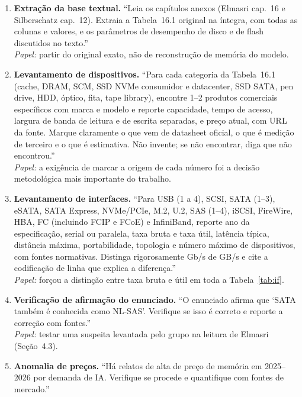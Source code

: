 \documentclass[11pt,a4paper]{article}
\begin{document}
\begin{enumerate}[label=\textbf{P\arabic*.},leftmargin=*]
\item \textbf{Extração da base textual.} ``Leia os capítulos anexos (Elmasri cap.~16 e
      Silberschatz cap.~12). Extraia a Tabela~16.1 original na íntegra, com todas as colunas e
      valores, e os parâmetros de desempenho de disco e de flash discutidos no texto.''\\
      \emph{Papel:} partir do original exato, não de reconstrução de memória do modelo.
\item \textbf{Levantamento de dispositivos.} ``Para cada categoria da Tabela~16.1 (cache, DRAM,
      SCM, SSD NVMe consumidor e datacenter, SSD SATA, pen drive, HDD, óptico, fita, tape
      library), encontre 1--2 produtos comerciais específicos com marca e modelo e reporte
      capacidade, tempo de acesso, largura de banda de leitura e de escrita separadas, e preço
      atual, com URL da fonte. Marque claramente o que vem de datasheet oficial, o que é
      medição de terceiro e o que é estimativa. Não invente; se não encontrar, diga que não
      encontrou.''\\
      \emph{Papel:} a exigência de marcar a origem de cada número foi a decisão metodológica
      mais importante do trabalho.
\item \textbf{Levantamento de interfaces.} ``Para USB (1 a 4), SCSI, SATA (1--3), eSATA, SATA
      Express, NVMe/PCIe, M.2, U.2, SAS (1--4), iSCSI, FireWire, HBA, FC (incluindo FCIP e
      FCoE) e InfiniBand, reporte ano da especificação, serial ou paralela, taxa bruta e taxa
      útil, latência típica, distância máxima, portabilidade, topologia e número máximo de
      dispositivos, com fontes normativas. Distinga rigorosamente Gb/s de GB/s e cite a
      codificação de linha que explica a diferença.''\\
      \emph{Papel:} forçou a distinção entre taxa bruta e útil em toda a Tabela~\ref{tab:if}.
\item \textbf{Verificação de afirmação do enunciado.} ``O enunciado afirma que `SATA também é
      conhecida como NL-SAS'. Verifique se isso é correto e reporte a correção com fontes.''\\
      \emph{Papel:} testar uma suspeita levantada pelo grupo na leitura de Elmasri (Seção~4.3).
\item \textbf{Anomalia de preços.} ``Há relatos de alta de preço de memória em 2025--2026 por
      demanda de IA. Verifique se procede e quantifique com fontes de mercado.''\\

\end{enumerate}
\end{document}
